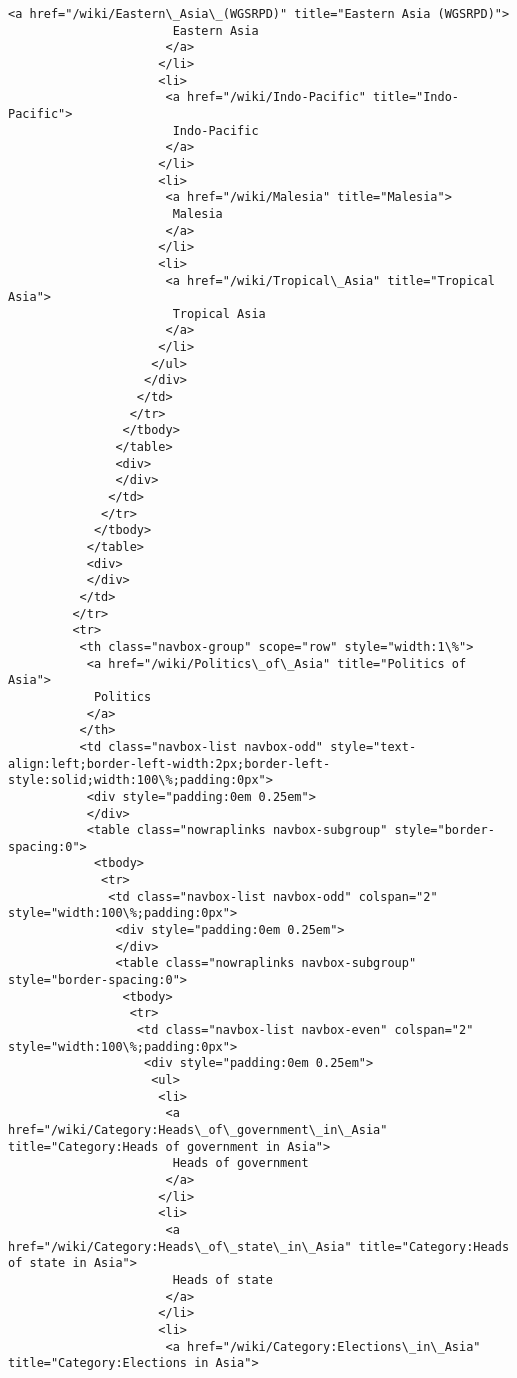 \documentclass[11pt]{article}
\begin{document}
\begin{Verbatim}[commandchars=\\\{\}]
                      <a href="/wiki/Eastern\_Asia\_(WGSRPD)" title="Eastern Asia (WGSRPD)">
                       Eastern Asia
                      </a>
                     </li>
                     <li>
                      <a href="/wiki/Indo-Pacific" title="Indo-Pacific">
                       Indo-Pacific
                      </a>
                     </li>
                     <li>
                      <a href="/wiki/Malesia" title="Malesia">
                       Malesia
                      </a>
                     </li>
                     <li>
                      <a href="/wiki/Tropical\_Asia" title="Tropical Asia">
                       Tropical Asia
                      </a>
                     </li>
                    </ul>
                   </div>
                  </td>
                 </tr>
                </tbody>
               </table>
               <div>
               </div>
              </td>
             </tr>
            </tbody>
           </table>
           <div>
           </div>
          </td>
         </tr>
         <tr>
          <th class="navbox-group" scope="row" style="width:1\%">
           <a href="/wiki/Politics\_of\_Asia" title="Politics of Asia">
            Politics
           </a>
          </th>
          <td class="navbox-list navbox-odd" style="text-align:left;border-left-width:2px;border-left-style:solid;width:100\%;padding:0px">
           <div style="padding:0em 0.25em">
           </div>
           <table class="nowraplinks navbox-subgroup" style="border-spacing:0">
            <tbody>
             <tr>
              <td class="navbox-list navbox-odd" colspan="2" style="width:100\%;padding:0px">
               <div style="padding:0em 0.25em">
               </div>
               <table class="nowraplinks navbox-subgroup" style="border-spacing:0">
                <tbody>
                 <tr>
                  <td class="navbox-list navbox-even" colspan="2" style="width:100\%;padding:0px">
                   <div style="padding:0em 0.25em">
                    <ul>
                     <li>
                      <a href="/wiki/Category:Heads\_of\_government\_in\_Asia" title="Category:Heads of government in Asia">
                       Heads of government
                      </a>
                     </li>
                     <li>
                      <a href="/wiki/Category:Heads\_of\_state\_in\_Asia" title="Category:Heads of state in Asia">
                       Heads of state
                      </a>
                     </li>
                     <li>
                      <a href="/wiki/Category:Elections\_in\_Asia" title="Category:Elections in Asia">

\end{Verbatim}
\end{document}
